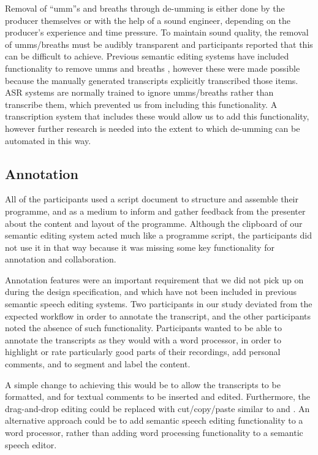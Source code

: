 Removal of ``umm''s and breaths through de-umming is either done by the producer themselves or with the help of a sound
engineer, depending on the producer's experience and time pressure. To maintain sound quality, the removal of
umms/breaths must be audibly transparent and participants reported that this can be difficult to achieve.  Previous
semantic editing systems have included functionality to remove umms \citep{Berthouzoz2012} and breaths
\citep{Rubin2013}, however these were made possible because the manually generated transcripts explicitly transcribed
those items. ASR systems are normally trained to ignore umms/breaths rather than transcribe them, which prevented us
from including this functionality. A transcription system that includes these would allow us to add this functionality,
however further research is needed into the extent to which de-umming can be automated in this way.

\subsection{Annotation}

All of the participants used a script document to structure and assemble their programme, and as a
medium to inform and gather feedback from the presenter about the content and layout of the programme. Although the
clipboard of our semantic editing system acted much like a programme script, the participants did not use it in that
way because it was missing some key functionality for annotation and collaboration.

Annotation features were an important requirement that we did not pick up on during the design specification, and which
have not been included in previous semantic speech editing systems. Two participants in our study deviated from the
expected workflow in order to annotate the transcript, and the other participants noted the absence of such
functionality. Participants wanted to be able to annotate the transcripts as they would with a word processor, in order
to highlight or rate particularly good parts of their recordings, add personal comments, and to segment and label the
content.

A simple change to achieving this would be to allow the transcripts to be formatted, and for textual comments to be
inserted and edited. Furthermore, the drag-and-drop editing could be replaced with cut/copy/paste similar to
\citet{Whittaker2004} and \citet{Rubin2013}. An alternative approach could be to add semantic speech editing
functionality to a word processor, rather than adding word processing functionality to a semantic speech editor.

